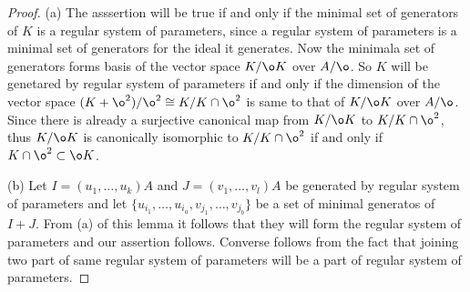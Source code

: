 \documentclass[10pt]{amsart}
\theoremstyle{plain}
\theoremstyle{definition}
\begin{document}
\begin{proof}
(a) The asssertion will be true if and only if the minimal set of generators of $K$ is a regular system of parameters, since a regular system of parameters is a minimal set of generators for the ideal it generates. Now the minimala set of generators forms basis of the vector space $K/\o K$ over $A/\o$. So $K$ will be genetared by regular system of parameters if and only if the dimension of the vector space $(K+{\o}^2)/{\o}^2\cong K/K\cap {\o}^2$ is same to that of $K/\o K$ over $A/\o$. Since there is already a surjective canonical map from $K/\o K$ to $K/K\cap {\o}^2$, thus $K/\o K$ is canonically isomorphic to $K/K\cap {\o}^2$ if and only if $K\cap {\o}^2\subset \o K$. 

(b) Let $I=({u}_1,\ldots,{u}_k)A$ and $J=({v}_1,\ldots,{v}_l)A$ be generated by regular system of parameters and let $\{{u}_{i_1},\ldots,{u}_{i_a}, {v}_{j_1},\ldots,{v}_{j_b}\}$ be a set of minimal generatos of $I+J$. %
From (a) of this lemma it follows that they will form the regular system of parameters and our assertion follows. Converse follows from the fact that joining two part of same regular system of parameters will be a part of regular system of parameters.

\end{proof}
\end{document}

